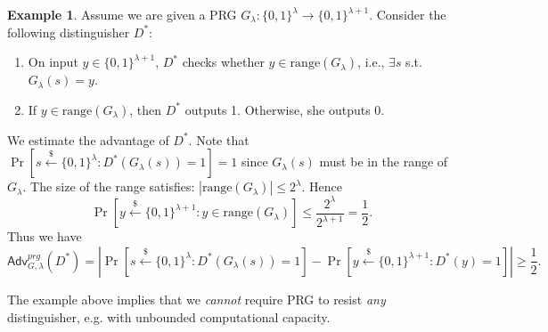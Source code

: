 \documentclass[12pt]{article}
\newcommand{\bits}{\{0,1\}}
\newcommand{\getsr}{\stackrel{\$}{\gets}}
\newcommand{\Adv}{\textsf{Adv}}
\theoremstyle{definition}
\newtheorem{example}[theorem]{Example}
\begin{document}
\begin{example}
\label{eg:2}
Assume we are given a PRG $G_\lambda : \bits^\lambda \to \bits^{\lambda+1}$. Consider the following distinguisher $D^*$: 
\begin{enumerate}
\item On input $y\in \bits^{\lambda+1}$, $D^*$ checks whether $y\in\mathrm{range}(G_\lambda)$, i.e., $\exists s$ s.t. $G_\lambda(s) = y$.
\item If $y\in\mathrm{range}(G_\lambda)$, then $D^*$ outputs 1. Otherwise, she outputs 0.
\end{enumerate}
We estimate the advantage of $D^*$. Note that $\Pr[s\getsr\bits^\lambda: D^*(G_\lambda(s))=1]=1$ since $G_\lambda(s)$ must be in the range of $G_\lambda$. The size of the range satisfies: $|\mathrm{range}(G_\lambda)|\leq 2^{\lambda}$. Hence
$$\Pr[y\getsr \bits^{\lambda+1}: y\in\mathrm{range}(G_\lambda)] \leq \frac{2^\lambda}{2^{\lambda+1}}=\frac{1}{2}.$$
Thus we have
$$\Adv_{G,\lambda}^{prg}(D^*) = \left| \Pr[s\getsr\bits^\lambda: D^*(G_\lambda(s))=1] - \Pr[y\getsr\bits^{\lambda+1}:D^*(y)=1] \right| \geq \frac{1}{2}.$$
\end{example}
The example above implies that we \emph{cannot} require PRG to resist \emph{any} distinguisher, e.g. with unbounded computational capacity.
\end{document}
